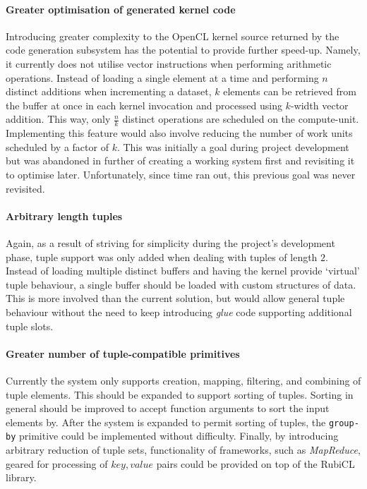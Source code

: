 \paragraph*{Greater optimisation of generated kernel code} Introducing greater complexity to the \ac{OpenCL} kernel source returned by the code generation subsystem has the potential to provide further speed-up. Namely, it currently does not utilise vector instructions when performing arithmetic operations. Instead of loading a single element at a time and performing $n$ distinct additions when incrementing a dataset, $k$ elements can be retrieved from the buffer at once in each kernel invocation and processed using $k$-width vector addition. This way, only $\frac{n}{k}$ distinct operations are scheduled on the compute-unit. Implementing this feature would also involve reducing the number of work units scheduled by a factor of $k$.
This was initially a goal during project development but was abandoned in further of creating a working system first and revisiting it to optimise later. Unfortunately, since time ran out, this previous goal was never revisited.

\paragraph*{Arbitrary length tuples} Again, as a result of striving for simplicity during the project's development phase, tuple support was only added when dealing with tuples of length $2$. Instead of loading multiple distinct buffers and having the kernel provide `virtual' tuple behaviour, a single buffer should be loaded with custom structures of data. This is more involved than the current solution, but would allow general tuple behaviour without the need to keep introducing \emph{glue} code supporting additional tuple slots.

\paragraph*{Greater number of tuple-compatible primitives} Currently the system only supports creation, mapping, filtering, and combining of tuple elements. This should be expanded to support sorting of tuples. Sorting in general should be improved to accept function arguments to sort the input elements by. After the system is expanded to permit sorting of tuples, the \verb|group-by| primitive could be implemented without difficulty. Finally, by introducing arbitrary reduction of tuple sets, functionality of frameworks, such as \emph{MapReduce}, geared for processing of $key, value$ pairs could be provided on top of the RubiCL library.

